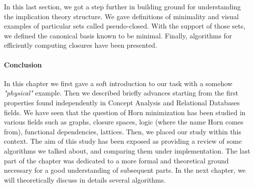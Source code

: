 \vspace{1.2em}


In this last section, we got a step further in building ground for understanding
the implication theory structure. We gave definitions of minimality and visual
examples of particular sets called pseudo-closed. With the support of those
sets, we defined the canonical basis known to be minimal. Finally, algorithms
for efficiently computing closures have been presented. 


\paragraph{Conclusion} In this chapter we first gave a soft introduction to our 
task with a somehow \textit{"physical"} example. Then we described briefly advances starting from the first properties found independently in Concept Analysis and Relational Databases fields. We have seen that the question of Horn minimization has been studied in various fields such as graphs, closure spaces, logic (where the name Horn comes from), functional dependencies, lattices. Then, we placed our study within this context. The aim of this study has been exposed as providing a review of some algorithms we talked about, and comparing them under implementation. The last part of the chapter was dedicated to a more formal and theoretical ground necessary for a good understanding of subsequent parts. In the next chapter, we will theoretically discuss in details several algorithms.

